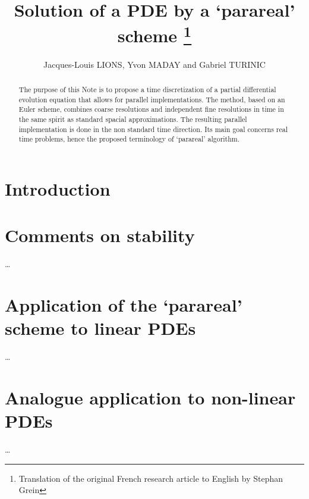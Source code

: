 \documentclass[12pt]{article}
\title{Solution of a PDE by a `parareal' scheme \footnote{Translation of the original French research article \cite{Lions2001} to English by Stephan Grein}}
\author{Jacques-Louis LIONS, Yvon MADAY and Gabriel TURINIC}
\begin{document}
\maketitle

\begin{abstract}
The purpose of this Note is to propose a time discretization of a partial differential evolution
equation that allows for parallel implementations. The method, based on an Euler scheme,
combines coarse resolutions and independent fine resolutions in time in the same spirit
as standard spacial approximations. The resulting parallel implementation is done in the
non standard time direction. Its main goal concerns real time problems, hence the proposed
terminology of `parareal' algorithm.
\end{abstract}

\tableofcontents
\newpage

\section{Introduction}

\section{Comments on stability}
\dots
\section{Application of the `parareal' scheme to linear PDEs}
\dots
\section{Analogue application to non-linear PDEs}
\dots




\end{document}
